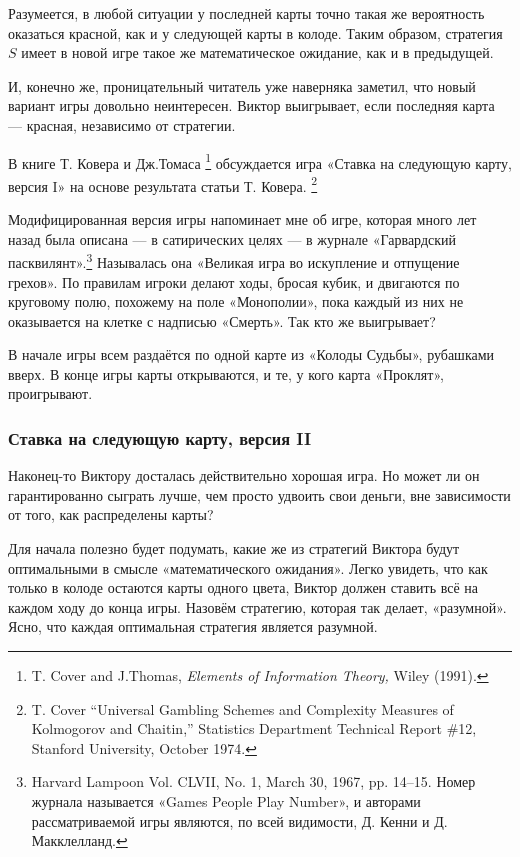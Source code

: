 Разумеется, в любой ситуации у последней карты точно такая же вероятность оказаться красной, как и у следующей карты в колоде.
Таким образом, стратегия $S$ имеет в новой игре такое же математическое ожидание, как и в предыдущей.

И, конечно же, проницательный читатель уже наверняка заметил, что новый вариант игры довольно неинтересен.
Виктор выигрывает, если последняя карта --- красная, независимо от стратегии.
\heart

В книге Т. Ковера и Дж.Томаса%
\footnote{T. Cover and J.Thomas, \emph{Elements of Information Theory,} Wiley (1991).} 
обсуждается игра «Ставка на следующую карту, версия I» на основе результата статьи Т. Ковера.%
\footnote{T. Cover “Universal Gambling Schemes and Complexity Measures of Kolmogorov and Chaitin,” Statistics Department Technical Report \#12, Stanford University, October 1974.}

Модифицированная версия игры %
напоминает мне об игре, которая много лет назад была описана --- в сатирических целях --- в журнале «Гарвардский пасквилянт».\footnote{Harvard Lampoon Vol. CLVII, No. 1, March 30, 1967, pp. 14--15.
Номер журнала называется «Games People Play Number», и авторами рассматриваемой игры являются, по всей видимости, Д. Кенни и Д. Макклелланд.%
}
Называлась она «Великая игра во искупление и отпущение грехов».
По правилам игроки делают ходы, бросая кубик, и двигаются по круговому полю, похожему на поле «Монополии», пока каждый из них не оказывается на клетке с надписью «Смерть».
Так кто же выигрывает?

В начале игры всем раздаётся по одной карте из «Колоды Судьбы», рубашками вверх.
В конце игры карты открываются, и те, у кого карта «Проклят», проигрывают.

\subsubsection*{Ставка на следующую карту, версия II}%

Наконец-то Виктору досталась действительно хорошая игра.
Но может ли он гарантированно сыграть лучше, чем просто удвоить свои деньги, вне зависимости от того, как распределены карты?

\medskip

Для начала полезно будет подумать, какие же из стратегий Виктора будут оптимальными в смысле «математического ожидания».
Легко увидеть, что как только в колоде остаются карты одного цвета, Виктор должен ставить всё на каждом ходу до конца игры.
Назовём стратегию, которая так делает, «разумной».
Ясно, что каждая оптимальная стратегия является разумной.

